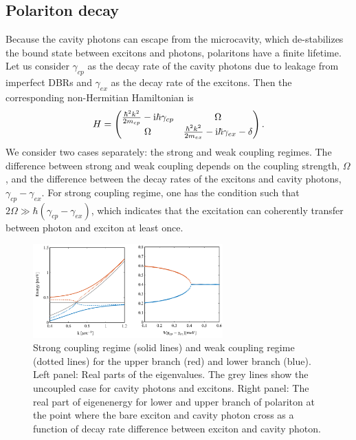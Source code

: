 \subsection{Polariton decay}
Because the cavity photons can escape from the microcavity, which de-stabilizes the bound state between excitons and photons, polaritons have a finite lifetime.
Let us consider $\gamma_{cp}$ as the decay rate of the cavity photons due to leakage from imperfect DBRs and $\gamma_{ex}$ as the decay rate of the excitons.
Then the corresponding non-Hermitian Hamiltonian is
%
\begin{equation}
        H =
    \begin{pmatrix}
        \frac{\hbar^2 k^2}{2m_{cp}} - \mathrm{i}\hbar\gamma_{cp} & \Omega \\
        \Omega &  \frac{\hbar^2 k^2}{2m_{ex}}-\mathrm{i}\hbar\gamma_{ex} - \delta
    \end{pmatrix}.
    \label{eq:Ch1_lifetime}
\end{equation}
%
We consider two cases separately: the strong and weak coupling regimes.
The difference between strong and weak coupling depends on the coupling strength, $\Omega$, and the difference between the decay rates of the excitons and cavity photons, $\gamma_{cp} - \gamma_{ex}$.
For strong coupling regime, one has the condition such that $2\Omega \gg \hbar\left(\gamma_{cp}-\gamma_{ex} \right)$, which indicates that the excitation can coherently transfer between photon and exciton at least once.
%
\begin{figure}[ht]
    \centering
    \includegraphics[width=0.65\textwidth]{Fig/Ch1/fig3.pdf}
    \caption[Polariton dispersion with decay]{Strong coupling regime (solid lines) and weak coupling regime (dotted lines) for the upper branch (red) and lower branch (blue). Left panel: Real parts of the eigenvalues. The grey lines show the uncoupled case for cavity photons and excitons. Right panel: The real part of eigenenergy for lower and upper branch of polariton at the point where the bare exciton and cavity photon cross as a function of decay rate difference between exciton and cavity photon.}
    \label{fig:Ch1_lifetime}
\end{figure}
%

